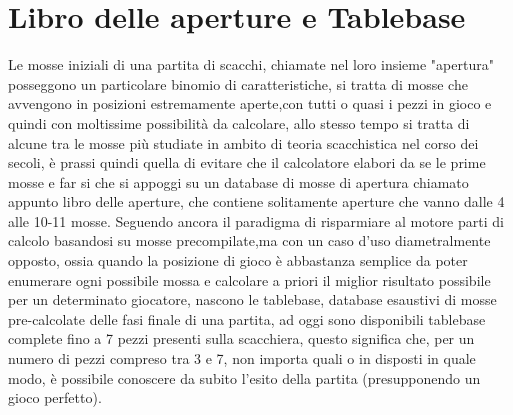 \section {Libro delle aperture e Tablebase}
Le mosse iniziali di una partita di scacchi, chiamate nel loro insieme "apertura" posseggono un particolare binomio di caratteristiche, si tratta di mosse che avvengono in posizioni estremamente aperte,con tutti o quasi i pezzi
in gioco e quindi con moltissime possibilità da calcolare, allo stesso tempo si tratta di alcune tra le mosse più studiate in ambito di teoria scacchistica nel corso dei secoli, è prassi quindi quella di evitare che
il calcolatore elabori da se le prime mosse e far si che si appoggi su un database di mosse di apertura chiamato appunto libro delle aperture, che contiene solitamente aperture che vanno dalle 4 alle 10-11 mosse.
Seguendo ancora il paradigma di risparmiare al motore parti di calcolo basandosi su mosse precompilate,ma con un caso d'uso diametralmente opposto, ossia quando la posizione di gioco è abbastanza semplice
da poter enumerare ogni possibile mossa e calcolare a priori il miglior risultato possibile per un determinato giocatore, nascono le tablebase, database esaustivi di mosse pre-calcolate delle fasi finale di una 
partita, ad oggi sono disponibili tablebase complete fino a 7 pezzi presenti sulla scacchiera, questo significa che, per un numero di pezzi compreso tra 3 e 7, non importa quali o in disposti in quale modo,
è possibile conoscere da subito l'esito della partita (presupponendo un gioco perfetto).
